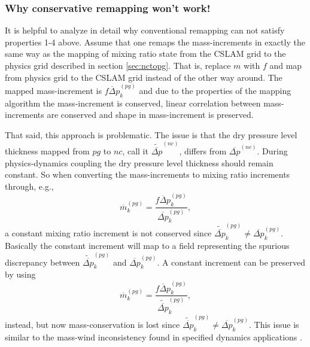 \subsubsection{Why conservative remapping won't work!}
It is helpful to analyze in detail why conventional remapping can not satisfy properties 1-4 above. Assume that one remaps the mass-increments in exactly the same way as the mapping of mixing ratio state from the CSLAM grid to the physics grid described in section \ref{sec:nctopg}. That is, replace $m$ with $f$ and map from physics grid to the CSLAM grid instead of the other way around. {\color{red}{explain algorithm with math ... need it for high-order preallocation!}} The mapped mass-increment is $\overline{f\Delta p}^{(pg)}_k$ and due to the properties of the mapping algorithm the mass-increment is conserved, linear correlation between mass-increments are conserved and shape in mass-increment is preserved.

That said, this approach is problematic. The issue is that the dry pressure level thickness mapped from $pg$ to $nc$, call it $\widetilde{\overline{\Delta p}}^{(nc)}$, differs from $\overline{\Delta p}^{(nc)}$. During physics-dynamics coupling the dry pressure level thickness should remain constant. So when converting the mass-increments to mixing ratio increments through, e.g.,
\begin{equation}
\overline{m}^{(pg)}_k=\frac{\overline{f\Delta p}^{(pg)}_k}{\overline{\Delta p}^{(pg)}_k},
\end{equation}
a constant mixing ratio increment is not conserved since $\widetilde{\overline{\Delta p}}^{(pg)}_k\ne {\overline{\Delta p}}^{(pg)}_k$. Basically the constant increment will map to a field representing the spurious discrepancy between $\widetilde{\overline{\Delta p}}^{(pg)}_k$ and ${\overline{\Delta p}}^{(pg)}_k$. A constant increment can be preserved by using
\begin{equation}
\overline{m}^{(pg)}_k=\frac{\overline{f\Delta p}^{(pg)}_k}{\widetilde{\overline{\Delta p}}^{(pg)}_k},
\end{equation}
instead, but now mass-conservation is lost since $\widetilde{\overline{\Delta p}}^{(pg)}_k\ne {\overline{\Delta p}}^{(pg)}_k$. This issue is similar to the mass-wind inconsistency found in specified dynamics applications \citep[e.g.][]{JKLSBCRE2001QJR}. 

